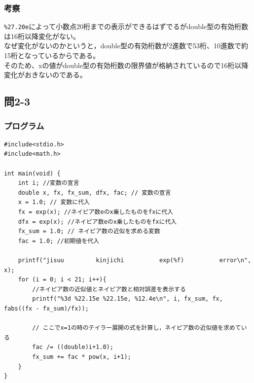 \documentclass{jarticle}
\begin{document}
\subsubsection{考察\\}
\verb|%27.20e|によって小数点20桁までの表示ができるはずでるがdouble型の有効桁数は16桁以降変化がない。\\
なぜ変化がないのかというと，double型の有効桁数が2進数で53桁、10進数で約15桁となっているからである。\\
そのため、xの値がdouble型の有効桁数の限界値が格納されているので16桁以降変化がおきないのである。\\


\subsection{問2-3\\}
\subsubsection{プログラム\\}
\begin{breakbox}
\begin{verbatim}
#include<stdio.h>
#include<math.h>

int main(void) { 
    int i; //変数の宣言
    double x, fx, fx_sum, dfx, fac; // 変数の宣言
    x = 1.0; // 変数に代入
    fx = exp(x); //ネイピア数eのx乗したものをfxに代入
    dfx = exp(x); //ネイピア数eのx乗したものをfxに代入
    fx_sum = 1.0; // ネイピア数の近似を求める変数
    fac = 1.0; //初期値を代入

    printf("jisuu         kinjichi          exp(%f)          error\n", x);
    for (i = 0; i < 21; i++){
    	//ネイピア数の近似値とネイピア数と相対誤差を表示する
        printf("%3d %22.15e %22.15e, %12.4e\n", i, fx_sum, fx, fabs((fx - fx_sum)/fx));
        
        // ここでx=1の時のテイラー展開の式を計算し，ネイピア数の近似値を求めている
        fac /= ((double)i+1.0);
        fx_sum += fac * pow(x, i+1);
    }
}
\end{verbatim}
\end{breakbox}
\end{document}
